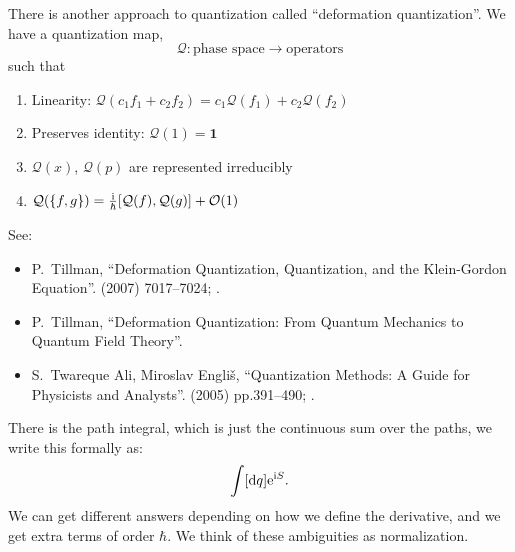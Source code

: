 There is another approach to quantization called ``deformation
quantization''. We have a quantization map,
\begin{equation}
\mathcal{Q}\colon\mbox{phase space}\to\mbox{operators}
\end{equation}
such that
\begin{enumerate}[nosep,label=(\arabic*)]
\item Linearity: $\mathcal{Q}(c_{1}f_{1}+c_{2}f_{2}) = c_{1}\mathcal{Q}(f_{1}) + c_{2}\mathcal{Q}(f_{2})$
\item Preserves identity: $\mathcal{Q}(1)=\mathbf{1}$
\item $\mathcal{Q}(x)$, $\mathcal{Q}(p)$ are represented irreducibly
\item $\mathcal{Q}(\{f,g\}) = \frac{\mathrm{i}}{\hbar}[\mathcal{Q}(f),\mathcal{Q}(g)] + \mathcal{O}(1)$
\end{enumerate}\medbreak\noindent%
See:
\begin{itemize}%
\item P.~Tillman, ``Deformation Quantization, Quantization, and the
Klein-Gordon Equation''.
  (2007) 7017--7024; .\\
{\tt{}}
\item P.~Tillman, ``Deformation Quantization: From Quantum Mechanics to
Quantum Field Theory''. 
\item S.~Twareque Ali, Miroslav Engli\v{s},
``Quantization Methods: A Guide for Physicists and Analysts''.
  (2005) pp.391--490;
.\\
{\tt{}}
\end{itemize}%
\medbreak

There is the path integral, which is just the continuous sum over the
paths, we write this formally as:
\begin{equation}
\int[\mathrm{d} q]\mathrm{e}^{\mathrm{i} S}.
\end{equation}
We can get different answers depending on how we define the derivative,
and we get extra terms of order $\hbar$. We think of these ambiguities
as normalization.
